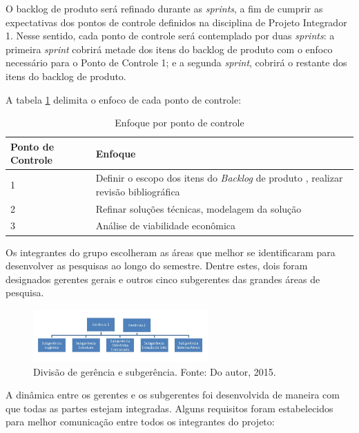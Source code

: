   O backlog de produto será refinado durante as \emph{sprints}, a fim de cumprir as expectativas dos pontos de controle definidos na disciplina de Projeto Integrador 1. Nesse sentido, cada ponto de controle será contemplado por duas \emph{sprints}: a primeira \emph{sprint} cobrirá metade dos itens do backlog de produto com o enfoco necessário para o Ponto de Controle 1; e a segunda \emph{sprint}, cobrirá o restante dos itens do backlog de produto.

  A tabela \ref{tab:enfoque_pc} delimita o enfoco de cada ponto de controle:

  \begin{table}[H]
  \centering
  \begin{tabular}{|p{4cm}|p{12cm}|}
  \hline
  Ponto de Controle & Enfoque                                                                                      \\ \hline
  1                 & Definir o escopo dos itens do \textit{Backlog} de produto , realizar revisão bibliográfica \\ \hline
  2                 & Refinar soluções técnicas, modelagem da solução                                              \\ \hline
  3                 & Análise de viabilidade econômica                                                             \\ \hline
  \end{tabular}
  \caption{Enfoque por ponto de controle}
  \label{tab:enfoque_pc}
  \end{table}

  Os integrantes do grupo escolheram as áreas que melhor se identificaram para desenvolver as pesquisas ao longo do semestre. Dentre estes, dois foram designados gerentes gerais e outros cinco subgerentes das grandes áreas de pesquisa.

  \begin{figure}[H]
  	\centering
  	\includegraphics[width=0.6\textwidth]{figuras/eap}
  	\caption{Divisão de gerência e subgerência. Fonte: Do autor, 2015.}
  	\label{img:eap}
  \end{figure}

  A dinâmica entre os gerentes e os subgerentes foi desenvolvida de maneira com que todas as partes estejam integradas. Alguns requisitos foram estabelecidos para melhor comunicação entre todos os integrantes do projeto:

